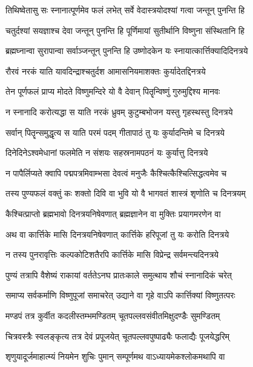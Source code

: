 \twolineshloka
{तिथिष्वेतासु सः स्नानात्पूर्णमेव फलं लभेत्}
{सर्वे वेदास्त्रयोदश्यां गत्वा जन्तून् पुनन्ति हि} %

\twolineshloka
{चतुर्दश्यां सयज्ञाश्च देवा जन्तून् पुनन्ति हि}
{पूर्णिमायां सुतीर्थानि विष्णुना संस्थितानि हि} %

\twolineshloka
{ब्रह्मघ्नान्वा सुरापान्वा सर्वाञ्जन्तून् पुनन्ति हि}
{उष्णोदकेन यः स्नायात्कार्त्तिक्यादिदिनत्रये} %

\twolineshloka
{रौरवं नरकं याति यावदिन्द्राश्चतुर्दश}
{आमासनियमाशक्तः कुर्यादेतद्दिनत्रये} %

\twolineshloka
{तेन पूर्णफलं प्राप्य मोदते विष्णुमन्दिरे}
{यो वै देवान् पितॄन्विष्णुं गुरुमुद्दिश्य मानवः} %

\twolineshloka
{न स्नानादि करोत्यद्धा स याति नरकं ध्रुवम्}
{कुटुम्बभोजन यस्तु गृहस्थस्तु दिनत्रये} %

\twolineshloka
{सर्वान् पितॄन्समुद्धृत्य स याति परमं पदम्}
{गीतापाठं तु यः कुर्यादन्तिमे च दिनत्रये} %

\twolineshloka
{दिनेदिनेऽश्वमेधानां फलमेति न संशयः}
{सहस्रनामपठनं यः कुर्यात्तु दिनत्रये} %

\twolineshloka
{न पापैर्लिप्यते क्वापि पद्मपत्रमिवाम्भसा}
{देवत्वं मनुजैः कैश्चित्कैश्चित्सिद्धत्वमेव च} %

\twolineshloka
{तस्य पुण्यफलं वक्तुं कः शक्तो दिवि वा भुवि}
{यो वै भागवतं शास्त्रं शृणोति च दिनत्रयम्} %

\twolineshloka
{कैश्चित्प्राप्तो ब्रह्मभावो दिनत्रयनिषेवणात्}
{ब्रह्मज्ञानेन वा मुक्तिः प्रयागमरणेन वा} %

\twolineshloka
{अथ वा कार्त्तिके मासि दिनत्रयनिषेवणात्}
{कार्त्तिके हरिपूजां तु यः करोति दिनत्रये} %

\twolineshloka
{न तस्य पुनरावृत्तिः कल्पकोटिशतैरपि}
{कार्त्तिके मासि विप्रेन्द्र सर्वमन्त्यदिनत्रये} %

\twolineshloka
{पुण्यं तत्रापि वैशेष्यं राकायां वर्ततेऽनघ}
{प्रातःकाले समुत्थाय शौचं स्नानादिकं चरेत्} %

\twolineshloka
{समाप्य सर्वकर्माणि विष्णुपूजां समाचरेत्}
{उद्याने वा गृहे वाऽपि कार्त्तिक्यां विष्णुतत्परः} %

\twolineshloka
{मण्डपं तत्र कुर्वीत कदलीस्तम्भमण्डितम्}
{चूतपल्लवसंवीतमिक्षुदण्डैः सुमण्डितम्} %

\twolineshloka
{चित्रवस्त्रैः स्वलङ्कृत्य तत्र देवं प्रपूजयेत्}
{चूतपल्लवपुष्पाढ्यैः फलाद्यैः पूजयेद्धरिम्} %

\twolineshloka
{शृणुयादूर्जमाहात्म्यं नियमेन शुचिः पुमान्}
{सम्पूर्णमथ वाऽध्यायमेकश्लोकमथापि वा} %


